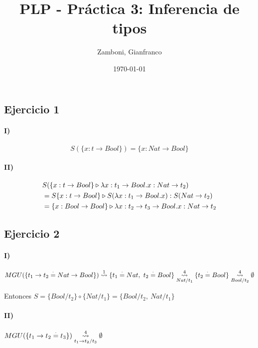 \documentclass[10pt,a4paper]{article}
\begin{document}
\title{PLP - Práctica 3: Inferencia de tipos}

\date{\today}

\author{Zamboni, Gianfranco}

\maketitle
\setcounter{page}{1}

\subsection{Ejercicio 1}
\paragraph{I)} $$S(\{x:t\to Bool\}) = \{x: Nat\to Bool\}$$
\paragraph{II)} 
\begin{equation*}
\begin{split}
&S(\judgeType{\{x:t\to Bool\}}{\lambdaAbs{x}{t_1\to Bool}{x}}{Nat\to t_2}) \\
&= \judgeType{S\{x:t\to Bool\}}{S(\lambdaAbs{x}{t_1\to Bool}{x})}{S(Nat\to t_2)} \\
&= \judgeType{\{x:Bool\to Bool\}}{\lambdaAbs{x}{t_2\to t_3\to Bool}{x}}{Nat\to t_2}
\end{split}
\end{equation*}

\subsection{Ejercicio 2}
\paragraph{I)}
\begin{align*}
MGU(\{t_1\to t_2\equalDot Nat\to Bool\}) \goesTo{1}{} \{t_1\equalDot Nat,~t_2\equalDot Bool\} \goesTo{4}{Nat/t_1} \{t_2\equalDot Bool\} \goesTo{4}{Bool/t_2} \emptyset
\end{align*}

Entonces $S=\{Bool/t_2\}\circ\{Nat/t_1\} = \{Bool/t_2,~Nat/t_1\}$

\paragraph{II)}$MGU(\{t_1\to t_2\equalDot t_3\}) \goesTo{4}{t_1\to t_2/t_3} \emptyset$
\end{document}
